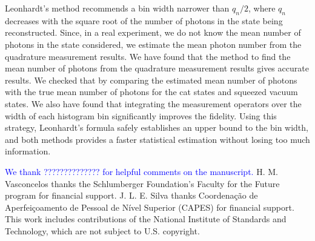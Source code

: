 \documentclass[
reprint,
superscriptaddress,
showpacs,
amsmath,
amssymb,
aps,
pra,
longbibliography
]{revtex4-1}
\providecommand{\editcolor}[2]{\textcolor{#1}{#2}}
\providecommand{\editcolor}[2]{#2}
\newcommand{\HV}[1]{\editcolor{blue}{#1}}
\begin{document}
Leonhardt's method recommends a bin width narrower than $q_n/2$, where
$q_n$ decreases with the square root of the number of photons in the
state being reconstructed.  Since, in a real experiment, we do not
know the mean number of photons in the state considered, we estimate
the mean photon number from the quadrature measurement results. We
have found that the method to find the mean number of photons
from the quadrature measurement results gives accurate results. We
checked that by comparing the estimated mean number of photons with
the true mean number of photons for the cat states and squeezed vacuum
states. We also have found that integrating the measurement operators
over the width of each histogram bin significantly improves the
fidelity. Using this strategy, Leonhardt's formula safely establishes
an upper bound to the bin width, and both methods provides a faster
statistical estimation without losing too much information.



\begin{acknowledgments}
  \HV{We thank ?????????????? for
    helpful comments on the manuscript.}  H. M. Vasconcelos thanks the
  Schlumberger Foundation's Faculty for the Future program for
  financial support. J. L. E. Silva thanks Coordena\c c\~ao de
  Aperfei\c coamento de Pessoal de N\'ivel Superior (CAPES) for
  financial support. This work includes contributions of the National
  Institute of Standards and Technology, which are not subject to
  U.S. copyright.
\end{acknowledgments}




%


\end{document}
